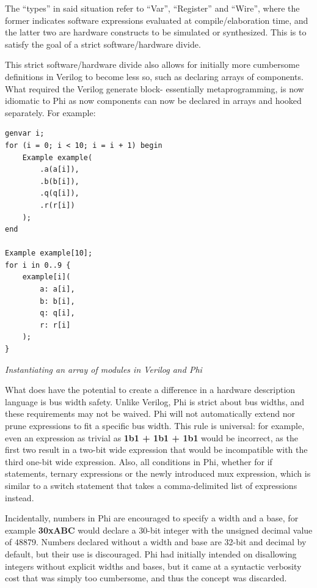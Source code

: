 \documentclass[10pt, two column]{article}
\theoremstyle{definition}
\begin{document}
The “types” in said situation refer to “Var”, “Register” and “Wire”, where the former indicates software expressions evaluated at compile/elaboration time, and the latter two are hardware constructs to be simulated or synthesized. This is to satisfy the goal of a strict software/hardware divide.\newline

This strict software/hardware divide also allows for initially more cumbersome definitions in Verilog to become less so, such as declaring arrays of components. What required the Verilog generate block- essentially metaprogramming, is now idiomatic to Phi as now components can now be declared in arrays and hooked separately. For example:\newline

\begin{lstlisting}
genvar i;
for (i = 0; i < 10; i = i + 1) begin
    Example example(
        .a(a[i]),
        .b(b[i]),
        .q(q[i]),
        .r(r[i])
    );
end

Example example[10];
for i in 0..9 {
    example[i](
        a: a[i],
        b: b[i],
        q: q[i],
        r: r[i]
    );
}
\end{lstlisting}
\begin{center}
\textit{Instantiating an array of modules in Verilog and Phi}
\end{center}

What does have the potential to create a difference in a hardware description language is bus width safety. Unlike Verilog, Phi is strict about bus widths, and these requirements may not be waived. Phi will not automatically extend nor prune expressions to fit a specific bus width. This rule is universal: for example, even an expression as trivial as \textbf{1b1 + 1b1 + 1b1} would be incorrect, as the first two result in a two-bit wide expression that would be incompatible with the third one-bit wide expression. Also, all conditions in Phi, whether for if statements, ternary expressions or the newly introduced mux expression, which is similar to a switch statement that takes a comma-delimited list of expressions instead.\newline 

Incidentally, numbers in Phi are encouraged to specify a width and a base, for example \textbf{30xABC} would declare a 30-bit integer with the unsigned decimal value of 48879. Numbers declared without a width and base are 32-bit and decimal by default, but their use is discouraged. Phi had initially intended on disallowing integers without explicit widths and bases, but it came at a syntactic verbosity cost that was simply too cumbersome, and thus the concept was discarded.\newline 
\end{document}
